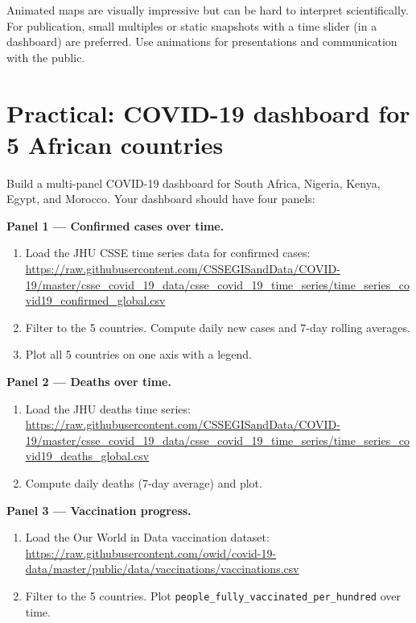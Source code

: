 \begin{warningbox}
Animated maps are visually impressive but can be hard to interpret scientifically. For publication, small multiples or static snapshots with a time slider (in a dashboard) are preferred. Use animations for presentations and communication with the public.
\end{warningbox}

\section{Practical: COVID-19 dashboard for 5 African countries}

\begin{exercise}
Build a multi-panel COVID-19 dashboard for South Africa, Nigeria, Kenya, Egypt, and Morocco. Your dashboard should have four panels:

\textbf{Panel 1 --- Confirmed cases over time.}
\begin{enumerate}
  \item Load the JHU CSSE time series data for confirmed cases:\\
  \url{https://raw.githubusercontent.com/CSSEGISandData/COVID-19/master/csse_covid_19_data/csse_covid_19_time_series/time_series_covid19_confirmed_global.csv}
  \item Filter to the 5 countries. Compute daily new cases and 7-day rolling averages.
  \item Plot all 5 countries on one axis with a legend.
\end{enumerate}

\textbf{Panel 2 --- Deaths over time.}
\begin{enumerate}
  \item Load the JHU deaths time series:\\
  \url{https://raw.githubusercontent.com/CSSEGISandData/COVID-19/master/csse_covid_19_data/csse_covid_19_time_series/time_series_covid19_deaths_global.csv}
  \item Compute daily deaths (7-day average) and plot.
\end{enumerate}

\textbf{Panel 3 --- Vaccination progress.}
\begin{enumerate}
  \item Load the Our World in Data vaccination dataset:\\
  \url{https://raw.githubusercontent.com/owid/covid-19-data/master/public/data/vaccinations/vaccinations.csv}
  \item Filter to the 5 countries. Plot \texttt{people\_fully\_vaccinated\_per\_hundred} over time.
\end{enumerate}


\end{exercise}

